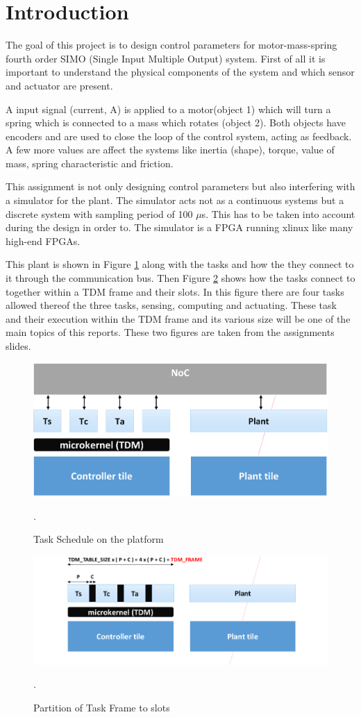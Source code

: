 \section{Introduction}
The goal of this project is to design control parameters for motor-mass-spring fourth order SIMO (Single Input Multiple Output) system. First of all it is important to understand the physical components of the system and which sensor and actuator are present.

A input signal (current, A) is applied to a motor(object 1) which will turn a spring which is connected to a mass which rotates (object 2). Both objects have encoders and are used to close the loop of the control system, acting as feedback. A few more values are affect the systems like inertia (shape), torque, value of mass, spring characteristic and friction.

This assignment is not only designing control parameters but also interfering with a simulator for the plant. The simulator acts not as a continuous systems but a discrete system with sampling period of 100 $\mu$s. This has to be taken into account during the design in order to. The simulator is a FPGA running xlinux like many high-end FPGAs.

This plant is shown in Figure \ref{fig:plant} along with the tasks and how the they connect to it through the communication bus. Then Figure \ref{fig:task} shows how the tasks connect to together within a TDM frame and their slots. In this figure there are four tasks allowed thereof the three tasks, sensing, computing and actuating. These task and their execution within the TDM frame and its various size will be one of the main topics of this reports. These two figures are taken from the assignments slides.

\begin{figure}[h]
	\begin{center}
		\includegraphics[width=0.7\linewidth]{img/plant}
		\caption{Task Schedule on the platform}.
		\label{fig:plant}
	\end{center}
\end{figure}

\begin{figure}[h]
	\begin{center}
		\includegraphics[width=0.7\linewidth]{img/task}
		\caption{Partition of Task Frame to slots}.
		\label{fig:task}
	\end{center}
\end{figure}




